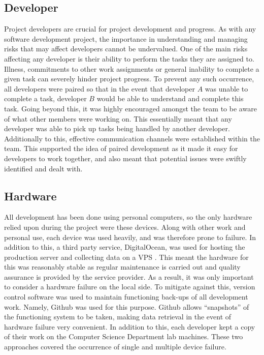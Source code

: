 \subsection{Developer}
Project developers are crucial for project development and progress. As with any software development project, the importance in understanding and managing risks that may affect developers cannot be undervalued. One of the main risks affecting any developer is their ability to perform the tasks they are assigned to. Illness, commitments to other work assignments or general inability to complete a given task can severely hinder project progress. To prevent any such occurrence, all developers were paired so that in the event that developer $A$ was unable to complete a task, developer $B$ would be able to understand and complete this task. Going beyond this, it was highly encouraged amongst the team to be aware of what other members were working on. This essentially meant that any developer was able to pick up tasks being handled by another developer. Additionally to this, effective communication channels were established within the team. This supported the idea of paired development as it made it easy for developers to work together, and also meant that potential issues were swiftly identified and dealt with.

\subsection{Hardware}
All development has been done using personal computers, so the only hardware relied upon during the project were these devices. Along with other work and personal use, each device was used heavily, and was therefore prone to failure. In addition to this, a third party service, DigitalOcean, was used for hosting the production server and collecting data on a VPS \cite{DigitalOcean:Home}. This meant the hardware for this was reasonably stable as regular maintenance is carried out and quality assurance is provided by the service provider. As a result, it was only important to consider a hardware failure on the local side. To mitigate against this, version control software was used to maintain functioning back-ups of all development work. Namely, Github was used for this purpose. Github allows ``snapshots'' of the functioning system to be taken, making data retrieval in the event of hardware failure very convenient. In addition to this, each developer kept a copy of their work on the Computer Science Department lab machines. These two approaches covered the occurrence of single and multiple device failure.

